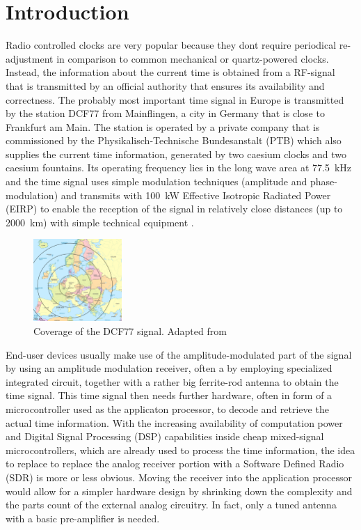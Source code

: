 \documentclass[conference]{IEEEtran}
\begin{document}
\section{Introduction}
Radio controlled clocks are very popular because they dont require periodical re-adjustment in comparison to common mechanical or quartz-powered clocks.
Instead, the information about the current time is obtained from a RF-signal that is transmitted by an official authority that ensures its availability and
correctness.
The probably most important time signal in Europe is transmitted by the station DCF77 from Mainflingen, a city in Germany that is close to Frankfurt am Main.
The station is operated by a private company that is commissioned by the Physikalisch-Technische Bundesanstalt (PTB) which also supplies the current time information,
generated by two caesium clocks and two caesium fountains. Its operating frequency lies in the long wave area at \SI{77.5}{\kilo\hertz} and the time signal
uses simple modulation techniques (amplitude and phase-modulation) and transmits with \SI{100}{\kilo\watt} Effective Isotropic Radiated Power (EIRP) to enable the reception of the signal in relatively close distances (up to \SI{2000}{\kilo\meter})
with simple technical equipment \cite{b2}.
\begin{figure}[!htbp]
    \centerline{\includegraphics[width=0.3\textwidth]{img/dcf77_range.jpg}}
    \caption{Coverage of the DCF77 signal. Adapted from \cite{b1}}
    \label{fig:dcf77_range}
\end{figure}
\FloatBarrier
End-user devices usually make use of the amplitude-modulated part of the signal by using an amplitude modulation receiver, often a by employing specialized integrated circuit,
together with a rather big ferrite-rod antenna to obtain the time signal.
This time signal then needs further hardware, often in form of a microcontroller used as the applicaton processor, to decode and retrieve the actual time information.
With the increasing availability of computation power and Digital Signal Processing (DSP) capabilities inside cheap mixed-signal microcontrollers, which are already used
to process the time information, the idea to replace to replace the analog receiver portion with a Software Defined Radio (SDR) is more or less obvious.
Moving the receiver into the application processor would allow for a simpler hardware design by shrinking down the complexity and the parts count of the
external analog circuitry. In fact, only a tuned antenna with a basic pre-amplifier is needed.
\end{document}
